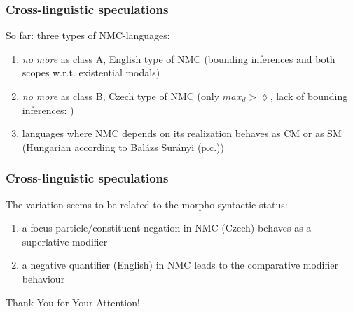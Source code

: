 \documentclass[10pt
]{beamer}
\begin{document}
\begin{frame}
  \frametitle{Cross-linguistic speculations}

  So far: three types of NMC-languages: 
  
  \begin{enumerate}
    \item \textit{no more} as class A, English type of NMC (bounding inferences and both scopes w.r.t. existential modals)
    \item \textit{no more} as class B, Czech type of NMC (only $max_d > \lozenge$, lack of bounding inferences: \cite{docekal_upper_2017})
    \item languages where NMC depends on its realization behaves as CM or as SM (Hungarian according to Balázs Surányi (p.c.))
  \end{enumerate}
  
\end{frame}

\begin{frame}
  \frametitle{Cross-linguistic speculations}


  The variation seems to be related to  the morpho-syntactic status:
  
  \begin{enumerate}
    \item a focus particle/constituent negation in NMC (Czech) behaves as a superlative modifier
    \item a negative quantifier (English) in NMC leads to the comparative modifier behaviour
  \end{enumerate}

\end{frame}

\begin{frame}[plain]
\vfill
\centerline{Thank You for Your Attention!}
\vfill\vfill
\end{frame}

\section{\bibname}
\begin{frame}[t, allowframebreaks]{\bibname}
\printbibliography[heading=none]
\end{frame}
\end{document}
